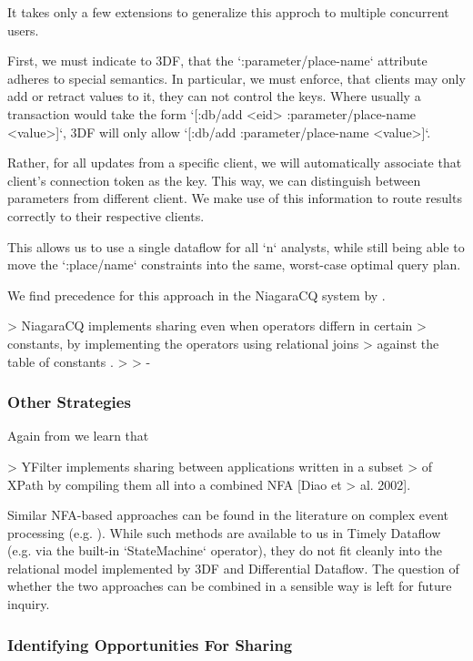 \documentclass[../catalog.tex]{subfiles}
\begin{document}
It takes only a few extensions to generalize this approch to multiple
concurrent users.

First, we must indicate to 3DF, that the `:parameter/place-name`
attribute adheres to special semantics. In particular, we must
enforce, that clients may only add or retract values to it, they can
not control the keys. Where usually a transaction would take the form
`[:db/add <eid> :parameter/place-name <value>]`, 3DF will only allow
`[:db/add :parameter/place-name <value>]`.

Rather, for all updates from a specific client, we will automatically
associate that client's connection token as the key. This way, we can
distinguish between parameters from different client. We make use of
this information to route results correctly to their respective
clients.

This allows us to use a single dataflow for all `n` analysts, while
still being able to move the `:place/name` constraints into the same,
worst-case optimal query plan.

We find precedence for this approach in the NiagaraCQ system by
\cite{chen2000niagaracq}.

> NiagaraCQ implements sharing even when operators differn in certain
> constants, by implementing the operators using relational joins
> against the table of constants \cite{chen2000niagaracq}.
> 
> - \cite{hirzel2014catalog}

\subsubsection{Other Strategies}

Again from \cite{hirzel2014catalog} we learn that

> YFilter implements sharing between applications written in a subset
> of XPath by compiling them all into a combined NFA [Diao et
> al. 2002].

Similar NFA-based approaches can be found in the literature on complex
event processing (e.g. \cite{agrawal2008}). While such methods are
available to us in Timely Dataflow (e.g. via the built-in
`StateMachine` operator), they do not fit cleanly into the relational
model implemented by 3DF and Differential Dataflow. The question of
whether the two approaches can be combined in a sensible way is left
for future inquiry.

\subsubsection{Identifying Opportunities For Sharing}
\end{document}
